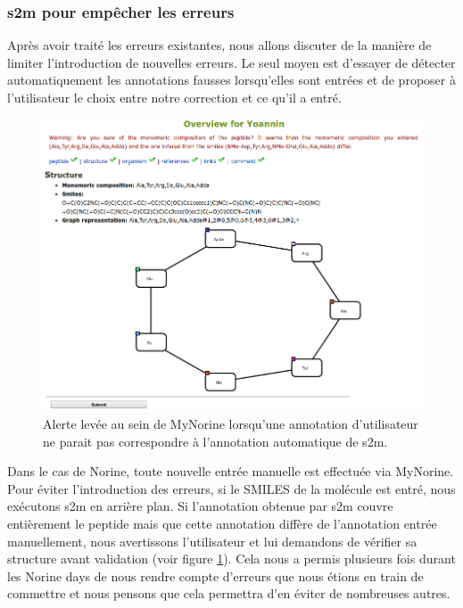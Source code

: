 \subsubsection{s2m pour empêcher les erreurs}

Après avoir traité les erreurs existantes, nous allons discuter de la manière de limiter l'introduction de nouvelles erreurs.
Le seul moyen est d'essayer de détecter automatiquement les annotations fausses lorsqu'elles sont entrées et de proposer à l'utilisateur le choix entre notre correction et ce qu'il a entré.

\begin{figure}[h!]
  \begin{center}
    \includegraphics[width=450px]{Figures/contributions/warning.png}
    \caption{\label{warning}Alerte levée au sein de MyNorine lorsqu'une annotation d'utilisateur ne parait pas correspondre à l'annotation automatique de s2m.}
  \end{center}
\end{figure}

Dans le cas de Norine, toute nouvelle entrée manuelle est effectuée via MyNorine.
Pour éviter l'introduction des erreurs, si le SMILES de la molécule est entré, nous exécutons s2m en arrière plan.
Si l'annotation obtenue par s2m couvre entièrement le peptide mais que cette annotation diffère de l'annotation entrée manuellement, nous avertissons l'utilisateur et lui demandons de vérifier sa structure avant validation (voir figure \ref{warning}).
Cela nous a permis plusieurs fois durant les Norine days de nous rendre compte d'erreurs que nous étions en train de commettre et nous pensons que cela permettra d'en éviter de nombreuses autres.

